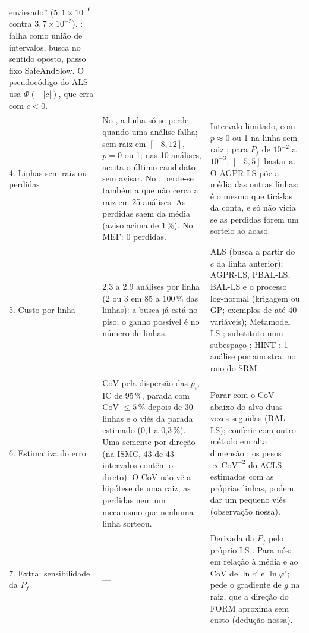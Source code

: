 \documentclass[11pt,a4paper]{article}
\newcommand{\sci}[2]{\ensuremath{#1\times10^{#2}}}
\begin{document}
{\begin{longtable}{L{2.3cm}L{6.6cm}L{6.8cm}}
  enviesado'' (\sci{5{,}1}{-6} contra \sci{3{,}7}{-5}). \citet{openturns}: falha como união de intervalos,
  busca no sentido oposto, passo fixo SafeAndSlow. O pseudocódigo do ALS usa $\Phi(-|c|)$, que erra com $c < 0$. \\
4. Linhas sem raiz ou perdidas &
  No , a linha só se perde quando uma análise falha; sem raiz em $[-8, 12]$, $p = 0$ ou 1; nas
  10 análises, aceita o último candidato sem avisar. No , perde-se também a que não cerca a raiz em 25
  análises. As perdidas saem da média (aviso acima de 1\,\%). No MEF: 0 perdidas. &
  Intervalo limitado, com $p \approx 0$ ou 1 na linha sem raiz \citep{cheng2025}; para $P_f$ de $10^{-2}$ a
  $10^{-3}$, $[-5, 5]$ bastaria. O AGPR-LS \citep{song2021} põe a média das outras linhas: é o mesmo que tirá-las da
  conta, e só não vicia se as perdidas forem um sorteio ao acaso. \\
5. Custo por linha &
  2,3 a 2,9 análises por linha (2 ou 3 em 85 a 100\,\% das linhas): a busca já está no piso; o ganho possível é no
  número de linhas. &
  ALS (busca a partir do $c$ da linha anterior); AGPR-LS, PBAL-LS, BAL-LS e o processo log-normal (krigagem ou GP;
  exemplos de até 40 variáveis); Metamodel LS \citep{depina2016}; substituto num subespaço \citep{ehre2022}; HINT
  \citep{depina2025}: 1 análise por amostra, no raio do SRM. \\
6. Estimativa do erro &
  CoV pela dispersão das $p_i$, IC de 95\,\%, parada com CoV $\le 5\,\%$ depois de 30 linhas e o viés da parada
  estimado (0,1 a 0,3\,\%). Uma semente por direção (na ISMC, 43 de 43 intervalos contêm o direto). O CoV não vê a
  hipótese de uma raiz, as perdidas nem um mecanismo que nenhuma linha sorteou. &
  Parar com o CoV abaixo do alvo duas vezes seguidas (BAL-LS); conferir com outro método em alta dimensão
  \citep{valdebenito2010,pradlwarter2007}; os pesos $\propto \mathrm{CoV}^{-2}$ do ACLS, estimados com as próprias
  linhas, podem dar um pequeno viés (observação nossa). \\
7. Extra: sensibilidade da $P_f$ &
  --- &
  Derivada da $P_f$ pelo próprio LS \citep{lu2008,valdebenito2018}. Para nós: em relação à média e ao CoV de $\ln c'$ e
  $\ln\varphi'$; pede o gradiente de $g$ na raiz, que a direção do FORM aproxima sem custo (dedução nossa). \\
\end{longtable}}
\end{document}

